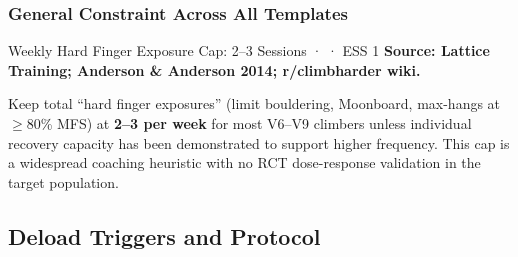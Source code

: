 \subsubsection*{General Constraint Across All Templates}

\begin{folklorebox}{Weekly Hard Finger Exposure Cap: 2--3 Sessions · \folkloreverified · ESS 1}
\textbf{Source: Lattice Training; Anderson \& Anderson 2014; r/climbharder wiki.}

Keep total ``hard finger exposures'' (limit bouldering, Moonboard, max-hangs at $\geq$80\% MFS) at \textbf{2–3 per week} for most V6–V9 climbers unless individual recovery capacity has been demonstrated to support higher frequency. This cap is a widespread coaching heuristic with no RCT dose-response validation in the target population.
\end{folklorebox}

\subsection{Deload Triggers and Protocol}
\label{subsec:deload}

